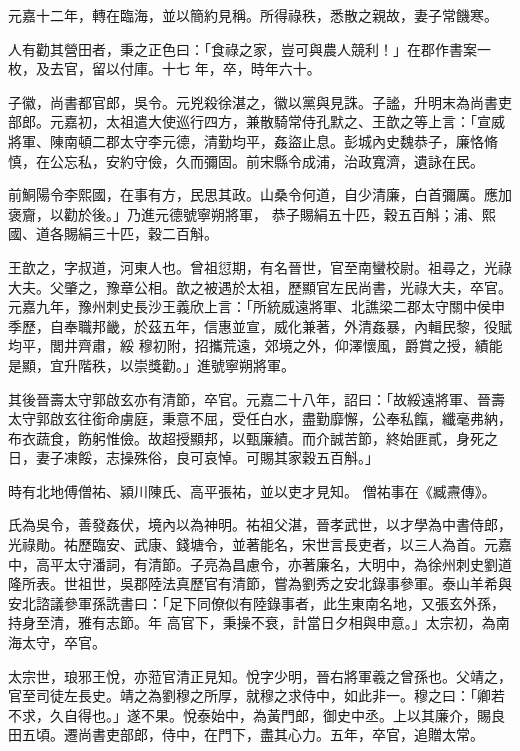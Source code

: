\begin{pinyinscope}
 元嘉十二年，轉在臨海，並以簡約見稱。所得祿秩，悉散之親故，妻子常饑寒。



 人有勸其營田者，秉之正色曰：「食祿之家，豈可與農人競利！」在郡作書案一枚，及去官，留以付庫。十七
 年，卒，時年六十。



 子徽，尚書都官郎，吳令。元兇殺徐湛之，徽以黨與見誅。子謐，升明末為尚書吏部郎。元嘉初，太祖遣大使巡行四方，兼散騎常侍孔默之、王歆之等上言：「宣威將軍、陳南頓二郡太守李元德，清勤均平，姦盜止息。彭城內史魏恭子，廉恪脩慎，在公忘私，安約守儉，久而彌固。前宋縣令成浦，治政寬濟，遺詠在民。



 前鮦陽令李熙國，在事有方，民思其政。山桑令何道，自少清廉，白首彌厲。應加褒齎，以勸於後。」乃進元德號寧朔將軍，
 恭子賜絹五十匹，穀五百斛；浦、熙國、道各賜絹三十匹，穀二百斛。



 王歆之，字叔道，河東人也。曾祖愆期，有名晉世，官至南蠻校尉。祖尋之，光祿大夫。父肇之，豫章公相。歆之被遇於太祖，歷顯官左民尚書，光祿大夫，卒官。元嘉九年，豫州刺史長沙王義欣上言：「所統威遠將軍、北譙梁二郡太守關中侯申季歷，自奉職邦畿，於茲五年，信惠並宣，威化兼著，外清姦暴，內輯民黎，役賦均平，閭井齊肅，綏
 穆初附，招攜荒遠，郊境之外，仰澤懷風，爵賞之授，績能是顯，宜升階秩，以崇獎勸。」進號寧朔將軍。



 其後晉壽太守郭啟玄亦有清節，卒官。元嘉二十八年，詔曰：「故綏遠將軍、晉壽太守郭啟玄往銜命虜庭，秉意不屈，受任白水，盡勤靡懈，公奉私餼，纖毫弗納，布衣蔬食，飭躬惟儉。故超授顯邦，以甄廉績。而介誠苦節，終始匪貳，身死之日，妻子凍餒，志操殊俗，良可哀悼。可賜其家穀五百斛。」



 時有北地傅僧祐、潁川陳氏、高平張祐，並以吏才見知。
 僧祐事在《臧燾傳》。



 氏為吳令，善發姦伏，境內以為神明。祐祖父湛，晉孝武世，以才學為中書侍郎，光祿勛。祐歷臨安、武康、錢塘令，並著能名，宋世言長吏者，以三人為首。元嘉中，高平太守潘詞，有清節。子亮為昌慮令，亦著廉名，大明中，為徐州刺史劉道隆所表。世祖世，吳郡陸法真歷官有清節，嘗為劉秀之安北錄事參軍。泰山羊希與安北諮議參軍孫詵書曰：「足下同僚似有陸錄事者，此生東南名地，又張玄外孫，持身至清，雅有志節。年
 高官下，秉操不衰，計當日夕相與申意。」太宗初，為南海太守，卒官。



 太宗世，琅邪王悅，亦蒞官清正見知。悅字少明，晉右將軍羲之曾孫也。父靖之，官至司徒左長史。靖之為劉穆之所厚，就穆之求侍中，如此非一。穆之曰：「卿若不求，久自得也。」遂不果。悅泰始中，為黃門郎，御史中丞。上以其廉介，賜良田五頃。遷尚書吏部郎，侍中，在門下，盡其心力。五年，卒官，追贈太常。




\end{pinyinscope}
